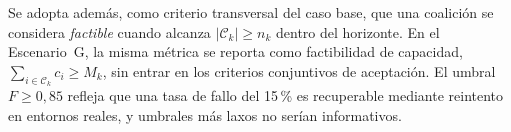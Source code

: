 Se adopta además, como criterio transversal del caso base, que una coalición se
considera \emph{factible} cuando alcanza $|\mathcal{C}_k| \geq n_k$ dentro del
horizonte. En el Escenario~G, la misma métrica se reporta como factibilidad de
capacidad, $\sum_{i\in\mathcal{C}_k}c_i \geq M_k$, sin entrar en los criterios
conjuntivos de aceptación. El umbral $F \geq 0{,}85$ refleja que una tasa de fallo del
15\,\% es recuperable mediante reintento en entornos reales, y umbrales más laxos no
serían informativos.
